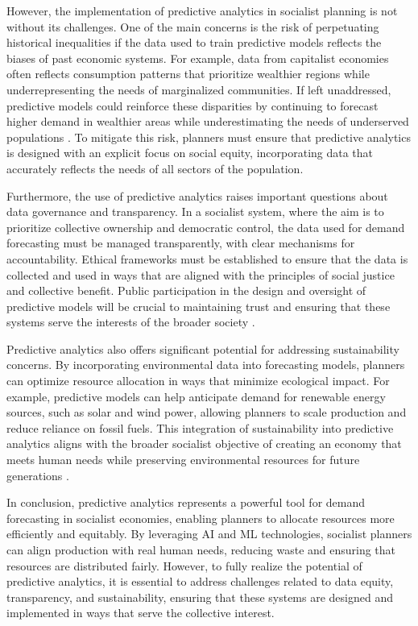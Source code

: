 \begin{refsection}
However, the implementation of predictive analytics in socialist planning is not without its challenges. One of the main concerns is the risk of perpetuating historical inequalities if the data used to train predictive models reflects the biases of past economic systems. For example, data from capitalist economies often reflects consumption patterns that prioritize wealthier regions while underrepresenting the needs of marginalized communities. If left unaddressed, predictive models could reinforce these disparities by continuing to forecast higher demand in wealthier areas while underestimating the needs of underserved populations \cite[pp.~78-81]{mazzucato2023}. To mitigate this risk, planners must ensure that predictive analytics is designed with an explicit focus on social equity, incorporating data that accurately reflects the needs of all sectors of the population.

Furthermore, the use of predictive analytics raises important questions about data governance and transparency. In a socialist system, where the aim is to prioritize collective ownership and democratic control, the data used for demand forecasting must be managed transparently, with clear mechanisms for accountability. Ethical frameworks must be established to ensure that the data is collected and used in ways that are aligned with the principles of social justice and collective benefit. Public participation in the design and oversight of predictive models will be crucial to maintaining trust and ensuring that these systems serve the interests of the broader society \cite[pp.~89-92]{treccani2021}.

Predictive analytics also offers significant potential for addressing sustainability concerns. By incorporating environmental data into forecasting models, planners can optimize resource allocation in ways that minimize ecological impact. For example, predictive models can help anticipate demand for renewable energy sources, such as solar and wind power, allowing planners to scale production and reduce reliance on fossil fuels. This integration of sustainability into predictive analytics aligns with the broader socialist objective of creating an economy that meets human needs while preserving environmental resources for future generations \cite[pp.~33-36]{mazzucato2023}.

In conclusion, predictive analytics represents a powerful tool for demand forecasting in socialist economies, enabling planners to allocate resources more efficiently and equitably. By leveraging AI and ML technologies, socialist planners can align production with real human needs, reducing waste and ensuring that resources are distributed fairly. However, to fully realize the potential of predictive analytics, it is essential to address challenges related to data equity, transparency, and sustainability, ensuring that these systems are designed and implemented in ways that serve the collective interest.


\end{refsection}
